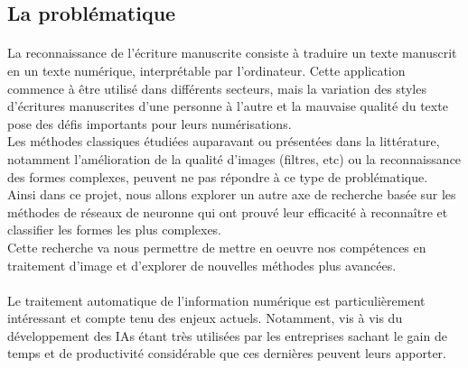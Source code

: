 \documentclass[a4paper]{article}
\begin{document}
		\subsection{La problématique}
			\paragraph{}
				La reconnaissance de l'écriture manuscrite consiste à traduire un texte manuscrit en un texte numérique, interprétable par l'ordinateur. Cette application commence à être utilisé dans différents secteurs, 
				mais la variation des styles d'écritures manuscrites d'une personne à l'autre et la mauvaise qualité du texte pose des défis importants pour leurs numérisations.%
\\Les méthodes classiques étudiées auparavant ou présentées dans la littérature, notamment l'amélioration de la qualité d'images (filtres, etc) ou la reconnaissance des formes complexes, peuvent ne pas répondre à ce type de problématique.
\\Ainsi dans ce projet, nous allons explorer un autre axe de recherche basée sur les méthodes de réseaux de neuronne qui ont prouvé leur efficacité à reconnaître et classifier les formes les plus complexes.
\\Cette recherche va nous permettre de mettre en oeuvre nos compétences en traitement d'image et d'explorer de nouvelles méthodes plus avancées.

		\paragraph{}
			Le traitement automatique de l'information numérique est particulièrement intéressant et  compte tenu des enjeux actuels. Notamment, vis à vis du développement des IAs étant très utilisées par les entreprises 
			sachant le gain de temps et de productivité considérable que ces dernières peuvent leurs apporter.
\end{document}

